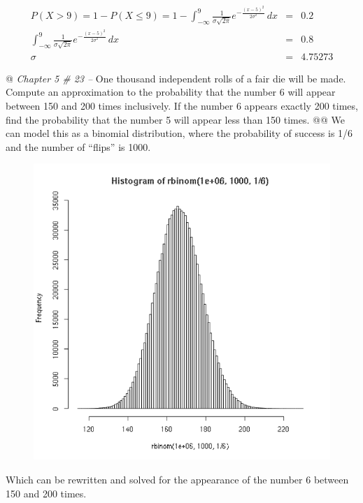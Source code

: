 \documentclass[10pt]{article}
\begin{document}
\begin{easylist}[enumerate]
    \[
        \begin{aligned}
            P(X > 9) = 1 - P(X \le 9) =
            1 - \int^9_{-\infty} \frac{1}{\sigma\sqrt{2\pi}} e^{-\frac{(x-5)^2}{2\sigma^2} } \, dx &=& 0.2\\
            \int^9_{-\infty} \frac{1}{\sigma\sqrt{2\pi}} e^{-\frac{(x-5)^2}{2\sigma^2} } \, dx &=& 0.8\\
            \sigma &=& \boxed{4.75273}
        \end{aligned}
    \]

    @ \textit{Chapter 5 \# 23 --} One thousand independent rolls of a fair die will be made. Compute an approximation to
    the probability that the number 6 will appear between 150 and 200 times inclusively. If the number 6 appears exactly
    200 times, find the probability that the number 5 will appear less than 150 times.
    @@ We can model this as a binomial distribution, where the probability of success is 1/6 and the number of ``flips''
    is 1000.

    \begin{figure}[!ht]
        \centering
        \includegraphics[scale=0.5]{./img/binomial0.png}
    \end{figure}

    Which can be rewritten and solved for the appearance of the number 6 between 150 and 200 times.


\end{easylist}
\end{document}
